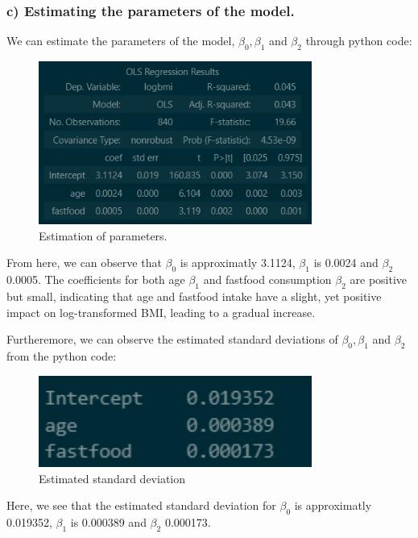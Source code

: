 \documentclass{rapport}
\begin{document}
\subsubsection*{\textbf{c)} Estimating the parameters of the model.}

We can estimate the parameters of the model, $\beta_0, \beta_1$ and $\beta_2$  through python code:
\begin{figure}[H]
    \centering
    \includegraphics[width=0.8\textwidth]{Figures/Estimation of parameters in the model.png}
    \caption{\small Estimation of parameters.}
    \label{fig:estimation_of_paramters}
\end{figure}

From here, we can observe that $\beta_0$ is approximatly 3.1124, $\beta_1$ is 0.0024 and 
$\beta_2$ 0.0005. 
\noindent
The coefficients for both age  $\beta_1$ and fastfood consumption $\beta_2$ are positive but small, indicating that age and fastfood intake have a slight, yet positive impact on log-transformed BMI, leading to a gradual increase.

Furtheremore, we can observe the estimated standard deviations of $\beta_0, \beta_1$ and $\beta_2$ from the python code:
\begin{figure}[H]
    \centering
    \includegraphics[width=0.8\textwidth]{Figures/Estimated std's.png}
    \caption{\small Estimated standard deviation}
    \label{fig:estimated_std's}
\end{figure}
\noindent
Here, we see that the estimated standard deviation for $\beta_0$ is approximatly 0.019352, $\beta_1$ is 0.000389 and 
$\beta_2$ 0.000173. 
\end{document}
